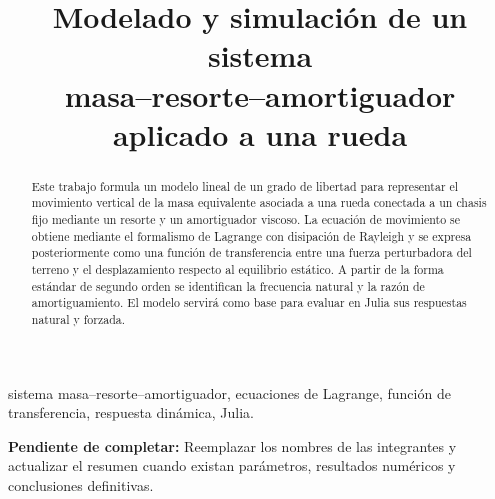 \documentclass[conference]{IEEEtran}
\title{Modelado y simulación de un sistema\\masa--resorte--amortiguador aplicado a una rueda}
\author{
  \IEEEauthorblockN{Maria José Álvarez Hernández \qquad Cristian Alejandro Guarin Marin}
  \IEEEauthorblockA{
    Matemáticas Especiales\\
    Universidad de Antioquia\\
    Medellín, Colombia}
}
\newcommand{\draftnote}[1]{%
  \par\smallskip
  \noindent\colorbox{draftgray}{%
    \parbox{\dimexpr\columnwidth-2\fboxsep\relax}{%
      \footnotesize\color{draftblue}\textbf{Pendiente de completar:} #1}}
  \par\smallskip
}
\begin{document}
\maketitle

\begin{abstract}
Este trabajo formula un modelo lineal de un grado de libertad para representar el movimiento vertical de la masa equivalente asociada a una rueda conectada a un chasis fijo mediante un resorte y un amortiguador viscoso. La ecuación de movimiento se obtiene mediante el formalismo de Lagrange con disipación de Rayleigh y se expresa posteriormente como una función de transferencia entre una fuerza perturbadora del terreno y el desplazamiento respecto al equilibrio estático. A partir de la forma estándar de segundo orden se identifican la frecuencia natural y la razón de amortiguamiento. El modelo servirá como base para evaluar en Julia sus respuestas natural y forzada.
\end{abstract}

\begin{IEEEkeywords}
sistema masa--resorte--amortiguador, ecuaciones de Lagrange, función de transferencia, respuesta dinámica, Julia.
\end{IEEEkeywords}

\draftnote{Reemplazar los nombres de las integrantes y actualizar el resumen cuando existan parámetros, resultados numéricos y conclusiones definitivas.}







\newpage



\appendices


% 
% 
\end{document}

